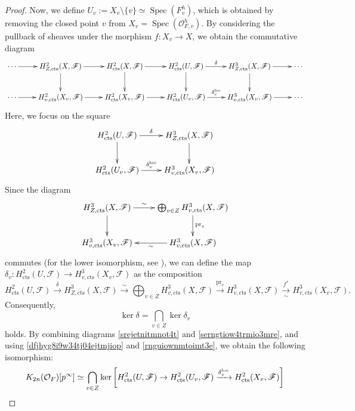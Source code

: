 \documentclass{article}
\numberwithin{equation}{section} %
\begin{document}
\begin{proof}
Now, we define $U_v := X_v \setminus \{v\} \simeq \operatorname{Spec}(F_v^h)$, which is obtained by removing the closed point $v$ from $X_v = \operatorname{Spec}(\mathcal{O}_{F,v}^h)$. By considering the pullback of sheaves under the morphism $f: X_v \to X$, we obtain the commutative diagram
\[
  \xymatrix{
    \cdots \ar[r] & H^2_{Z,\mathrm{cts}}(X,\mathscr{F}) \ar[r] \ar[d] & H^2_{\mathrm{cts}}(X,\mathscr{F}) \ar[r] \ar[d] & H^2_{\mathrm{cts}}(U,\mathscr{F}) \ar[r]^-{\delta} \ar[d] & H^{3}_{Z,\mathrm{cts}}(X,\mathscr{F}) \ar[r] \ar[d] & \cdots \\
    \cdots \ar[r] & H^2_{v,\mathrm{cts}}(X_v,\mathscr{F}) \ar[r] & H^2_{\mathrm{cts}}(X_v,\mathscr{F}) \ar[r] & H^2_{\mathrm{cts}}(U_v,\mathscr{F}) \ar[r]^-{\delta_{v}^{\rm loc}} & H^{3}_{v,\mathrm{cts}}(X_v,\mathscr{F}) \ar[r] & \cdots 
  }
\]
Here, we focus on the square
\begin{equation}
  \label{srejetnitmnot4t}
  \vcenter{
  \xymatrix{
     H^2_{\mathrm{cts}}(U,\mathscr{F}) \ar[r]^-{\delta} \ar[d] & H^3_{Z,\mathrm{cts}}(X,\mathscr{F}) \ar[d] \\
     H^2_{\mathrm{cts}}(U_v,\mathscr{F}) \ar[r]^-{\delta_v^{\rm loc}} & H^3_{v,\mathrm{cts}}(X_v,\mathscr{F})
  }
  }
\end{equation}
Since the diagram
\begin{equation}
  \label{serngtiow4trmio3mre}
  \vcenter{
  \xymatrix{
     H^3_{Z,\mathrm{cts}}(X,\mathscr{F}) \ar[d] \ar[r]^-{\sim} & \bigoplus_{v \in Z} H^3_{v,\mathrm{cts}}(X,\mathscr{F}) \ar[d]^{\mathrm{pr}_v} \\
     H^3_{v,\mathrm{cts}}(X_v,\mathscr{F}) & H^3_{v,\mathrm{cts}}(X,\mathscr{F}) \ar[l]^-{\sim}
  }
  }
\end{equation}
commutes (for the lower isomorphism, see \cite[(3.8) Proposition]{Jannsen}), we can define the map $\delta_v: H^2_{\mathrm{cts}}(U,\mathscr{F}) \to H^3_{v,\mathrm{cts}}(X_v,\mathscr{F})$ as the composition
\begin{equation*}
  H^2_{\mathrm{cts}}(U,\mathscr{F}) \xrightarrow{\delta} H^3_{Z,\mathrm{cts}}(X,\mathscr{F}) \xrightarrow{\sim} \bigoplus_{v \in Z} H^3_{v,\mathrm{cts}}(X,\mathscr{F}) \xrightarrow{\text{pr}_v} H^3_{v,\mathrm{cts}}(X,\mathscr{F}) \xrightarrow[\sim]{f^*} H^3_{v,\mathrm{cts}}(X_v,\mathscr{F}).
\end{equation*}
Consequently,
\begin{equation}
    \label{rnguiownmtoimt3e}
  \operatorname{ker}\delta = \bigcap_{v \in Z} \operatorname{ker}\delta_v
\end{equation}
holds. By combining diagrams \eqref{srejetnitmnot4t} and \eqref{serngtiow4trmio3mre}, and using \eqref{dfjhyg8i9w34tj04ejtmjiop} and \eqref{rnguiownmtoimt3e}, we obtain the following isomorphism:
\begin{equation}
    \label{erhjgio3wmjtoi4tjop}
  K_{2n}(\mathcal{O}_F)[p^\infty] \simeq \bigcap_{v\in Z}\operatorname{ker}\left[ H^2_{\rm cts}(U,\mathscr{F}) \to H^2_{\rm cts}(U_v,\mathscr{F}) \xrightarrow{\delta_v^{\rm loc}} H^2_{\rm cts}(X_v,\mathscr{F})\right]
\end{equation}



\end{proof}
\end{document}
